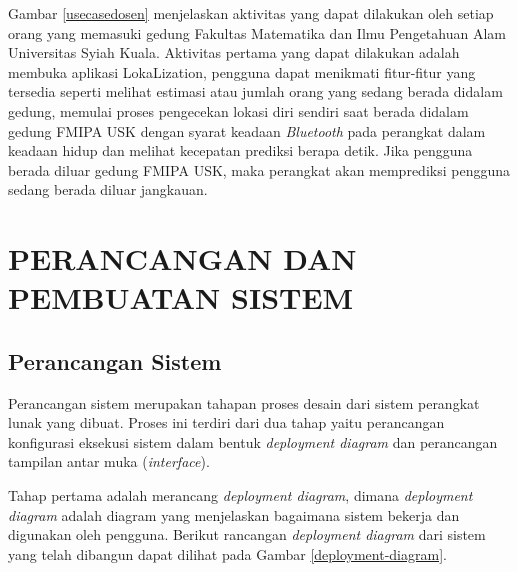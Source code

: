\par Gambar \ref{usecasedosen} menjelaskan aktivitas yang dapat dilakukan oleh setiap orang yang memasuki gedung Fakultas Matematika dan Ilmu Pengetahuan Alam Universitas Syiah Kuala. Aktivitas pertama yang dapat dilakukan adalah membuka aplikasi LokaLization, pengguna dapat menikmati fitur-fitur yang tersedia seperti melihat estimasi atau jumlah orang yang sedang berada didalam gedung, memulai proses pengecekan lokasi diri sendiri saat berada didalam gedung FMIPA USK dengan syarat keadaan \textit{Bluetooth} pada perangkat dalam keadaan hidup dan melihat kecepatan prediksi berapa detik. Jika pengguna berada diluar gedung FMIPA USK, maka perangkat akan memprediksi pengguna sedang berada diluar jangkauan.


\section{\uppercase{PERANCANGAN DAN PEMBUATAN SISTEM}}

\subsection{Perancangan Sistem}
\par Perancangan sistem merupakan tahapan proses desain dari sistem perangkat lunak yang dibuat. Proses ini terdiri dari dua tahap yaitu perancangan konfigurasi eksekusi sistem dalam bentuk \textit{deployment diagram} dan perancangan tampilan antar muka (\textit{interface}).

Tahap pertama adalah merancang \textit{deployment diagram}, dimana \textit{deployment diagram} adalah diagram yang menjelaskan bagaimana sistem bekerja dan digunakan oleh pengguna. Berikut rancangan \textit{deployment diagram} dari sistem yang telah dibangun dapat dilihat pada Gambar \ref{deployment-diagram}.

